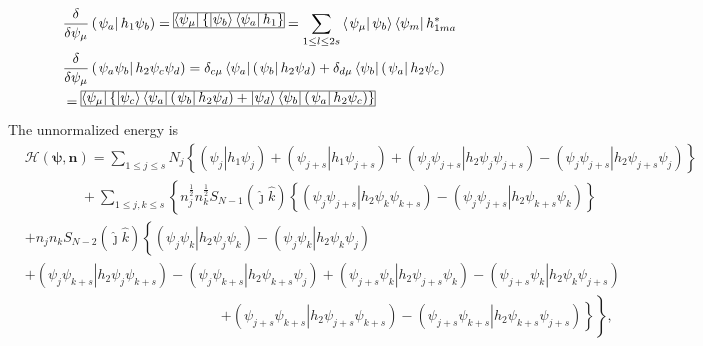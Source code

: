 \documentclass[aps,preprint]{revtex4}%
\begin{document}
\begin{align}
&  \frac{\delta}{\delta\psi_{\mu}}\left(  \left.  \psi_{a}\right\vert
h_{1}\psi_{b}\right)  =\frame{$\left\langle \psi_\mu\right\vert \left\{
\left\vert \psi_b\right\rangle \left\langle \psi_a\right\vert h_1\right\}
$}=\sum_{1\leq l\leq2s}\left\langle \left.  \psi_{\mu}\right\vert \psi
_{b}\right\rangle \left\langle \psi_{m}\right\vert h_{1ma}^{\ast}\nonumber\\
&  \frac{\delta}{\delta\psi_{\mu}}\left(  \left.  \psi_{a}\psi_{b}\right\vert
h_{2}\psi_{c}\psi_{d}\right)  =\delta_{c\mu}\left\langle \psi_{a}\right\vert
\left(  \left.  \psi_{b}\right\vert h_{2}\psi_{d}\right)  +\delta_{d\mu
}\left\langle \psi_{b}\right\vert \left(  \left.  \psi_{a}\right\vert
h_{2}\psi_{c}\right) \nonumber\\
&  =\frame{$\left\langle \psi_\mu\right\vert \left\{  \left\vert
\psi_c\right\rangle \left\langle \psi_a\right\vert \left(  \left.
\psi_b\right\vert h_2\psi_d\right)  +\left\vert \psi_d\right\rangle
\left\langle \psi_b\right\vert \left(  \left.  \psi_a\right\vert
h_2\psi_c\right)  \right\}  $}%
\end{align}
The unnormalized energy is
\begin{align}
&  \mathcal{H}\left(  \mathbf{\psi,n}\right)  =\sum_{1\leq j\leq s}%
N_{j}\left\{  \left(  \left.  \psi_{j}\right\vert h_{1}\psi_{j}\right)
+\left(  \left.  \psi_{j+s}\right\vert h_{1}\psi_{j+s}\right)  +\left(
\left.  \psi_{j}\psi_{j+s}\right\vert h_{2}\psi_{j}\psi_{j+s}\right)  -\left(
\left.  \psi_{j}\psi_{j+s}\right\vert h_{2}\psi_{j+s}\psi_{j}\right)  \right\}
\nonumber\\
&  \qquad\qquad+\sum_{1\leq j,k\leq s}\left\{  n_{j}^{\frac{1}{2}}n_{k}%
^{\frac{1}{2}}S_{N-1}\left(  \hat{\jmath}\hat{k}\right)  \left\{  \left(
\left.  \psi_{j}\psi_{j+s}\right\vert h_{2}\psi_{k}\psi_{k+s}\right)  -\left(
\left.  \psi_{j}\psi_{j+s}\right\vert h_{2}\psi_{k+s}\psi_{k}\right)
\right\}  \right. \nonumber\\
&  +n_{j}n_{k}S_{N-2}\left(  \hat{\jmath}\hat{k}\right)  \left\{  \overset
{}{\left(  \left.  \psi_{j}\psi_{k}\right\vert h_{2}\psi_{j}\psi_{k}\right)
-\left(  \left.  \psi_{j}\psi_{k}\right\vert h_{2}\psi_{k}\psi_{j}\right)
}\right. \nonumber\\
&  +\left(  \left.  \psi_{j}\psi_{k+s}\right\vert h_{2}\psi_{j}\psi
_{k+s}\right)  -\left(  \left.  \psi_{j}\psi_{k+s}\right\vert h_{2}\psi
_{k+s}\psi_{j}\right)  +\left(  \left.  \psi_{j+s}\psi_{k}\right\vert
h_{2}\psi_{j+s}\psi_{k}\right)  -\left(  \left.  \psi_{j+s}\psi_{k}\right\vert
h_{2}\psi_{k}\psi_{j+s}\right) \nonumber\\
&  \qquad\qquad\qquad\qquad\qquad\qquad\qquad\left.  \overset{}{\left.
+\left(  \left.  \psi_{j+s}\psi_{k+s}\right\vert h_{2}\psi_{j+s}\psi
_{k+s}\right)  -\left(  \left.  \psi_{j+s}\psi_{k+s}\right\vert h_{2}%
\psi_{k+s}\psi_{j+s}\right)  \right\}  }\right\}  , \label{unnormE}%
\end{align}
\end{document}
